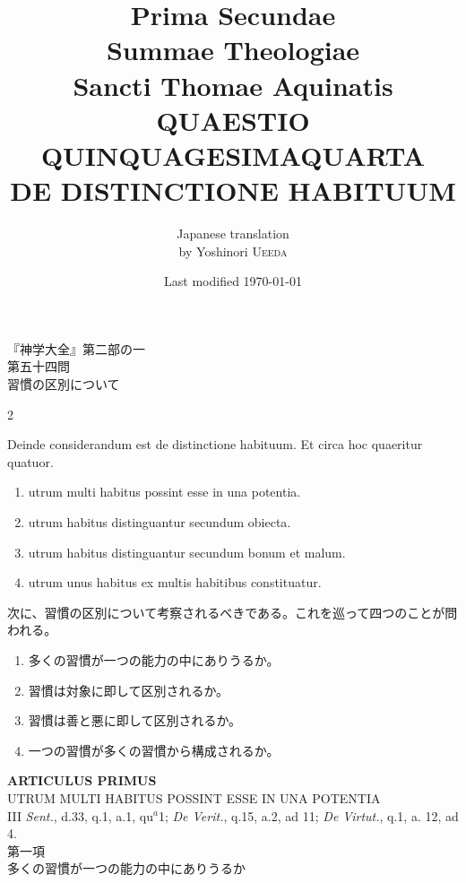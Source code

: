 \documentclass[paper=a4paper,fontsize=10pt,jafontsize=9pt,titlepage]{jlreq}
\title{{\bfseries Prima Secundae}\\{\Huge Summae Theologiae}\\Sancti Thomae
Aquinatis\\{\sffamily QUAESTIO QUINQUAGESIMAQUARTA}\\{\bfseries DE DISTINCTIONE HABITUUM}}
\author{Japanese translation\\by Yoshinori {\scshape Ueeda}}
\date{Last modified \today}
\begin{document}
\maketitle
\thispagestyle{empty}
\begin{center}
{\Large 『神学大全』第二部の一\\第五十四問\\習慣の区別について}
\end{center}

\begin{paracol}{2}

Deinde considerandum est de distinctione habituum. Et circa hoc quaeritur quatuor.

\begin{enumerate}
 \item utrum multi habitus possint esse in una potentia.
 \item utrum habitus distinguantur secundum obiecta.
 \item utrum habitus distinguantur secundum bonum et malum.
 \item utrum unus habitus ex multis habitibus constituatur.
\end{enumerate}

\switchcolumn

次に、習慣の区別について考察されるべきである。これを巡って四つのことが問われる。
\begin{enumerate}
 \item 多くの習慣が一つの能力の中にありうるか。
 \item 習慣は対象に即して区別されるか。
 \item 習慣は善と悪に即して区別されるか。
 \item 一つの習慣が多くの習慣から構成されるか。
\end{enumerate}

\end{paracol}
\newpage
{}
{}
\setcounter{section}{1}
\setcounter{subsection}{0}

\begin{center}
{\Large {\bfseries ARTICULUS PRIMUS}}\\
{\large UTRUM MULTI HABITUS POSSINT ESSE IN UNA POTENTIA}\\
{\footnotesize III {\itshape Sent.}, d.33, q.1, a.1, qu$^a$1; {\itshape De Verit.}, q.15, a.2, ad 11; {\itshape De Virtut.}, q.1, a. 12, ad 4.}\\
{\Large 第一項\\多くの習慣が一つの能力の中にありうるか}
\end{center}
\end{document}
